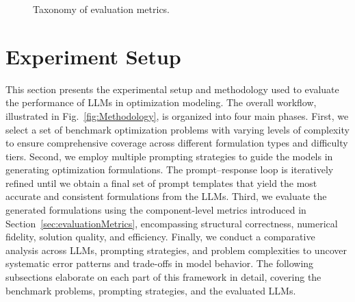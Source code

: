 \documentclass[review,12pt]{elsarticle}
\begin{document}
\begin{figure}[htbp]
{{
}
}
\caption{Taxonomy of evaluation metrics.}
\label{fig:taxonomy_gap}
\end{figure}



\vspace{-3mm}
\section{Experiment Setup}\label{sec:Experimental_Setup}

This section presents the experimental setup and methodology used to evaluate the performance of LLMs in optimization modeling. The overall workflow, illustrated in Fig.~\ref{fig:Methodology}, is organized into four main phases.
First, we select a set of benchmark optimization problems with varying levels of complexity to ensure comprehensive coverage across different formulation types and difficulty tiers. Second, we employ multiple prompting strategies to guide the models in generating optimization formulations. The prompt–response loop is iteratively refined until we obtain a final set of prompt templates that yield the most accurate and consistent formulations from the LLMs. Third, we evaluate the generated formulations using the component-level metrics introduced in Section~\ref{sec:evaluationMetrics}, encompassing structural correctness, numerical fidelity, solution quality, and efficiency. Finally, we conduct a comparative analysis across LLMs, prompting strategies, and problem complexities to uncover systematic error patterns and trade-offs in model behavior. The following subsections elaborate on each part of this framework in detail, covering the benchmark problems, prompting strategies, and the evaluated LLMs.
\end{document}
